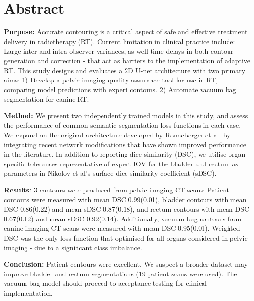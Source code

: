 \chapter{Abstract}
\label{ch:abstract}

\textbf{Purpose:} Accurate contouring is a critical aspect of safe and effective treatment delivery in radiotherapy (RT). Current limitation in clinical practice include:  Large inter and intra-observer variances, as well time delays in both contour generation and correction - that act as barriers to the implementation of adaptive RT. This study designs and evaluates a 2D U-net architecture with two primary aims: 1) Develop a pelvic imaging quality assurance tool for use in RT, comparing model predictions with expert contours. 2) Automate vacuum bag segmentation for canine RT.

\textbf{Method:}
 We present two independently trained models in this study, and assess the performance of common semantic segmentation loss functions in each case. We expand on the original architecture developed by Ronneberger et al. by integrating recent network modifications that have shown improved performance in the literature. In addition to reporting dice similarity (DSC), we utilise organ-specific tolerances representative of expert IOV for the bladder and rectum as parameters in Nikolov et al's surface dice similarity coefficient (sDSC).

\textbf{Results:}
3 contours were produced from pelvic imaging CT scans: Patient contours were measured with mean DSC 0.99(0.01), bladder contours with mean DSC 0.86(0.22) and mean sDSC 0.87(0.18), and rectum contours with mean DSC 0.67(0.12) and mean sDSC 0.92(0.14). Additionally, vacuum bag contours from canine imaging CT scans were measured with mean DSC 0.95(0.01). Weighted DSC was the only loss function that optimised for all organs considered in pelvic imaging - due to a significant class imbalance.

\textbf{Conclusion:}
Patient contours were excellent. We suspect a broader dataset may improve bladder and rectum segmentations (19 patient scans were used). The vacuum bag model should proceed to acceptance testing for clinical implementation.